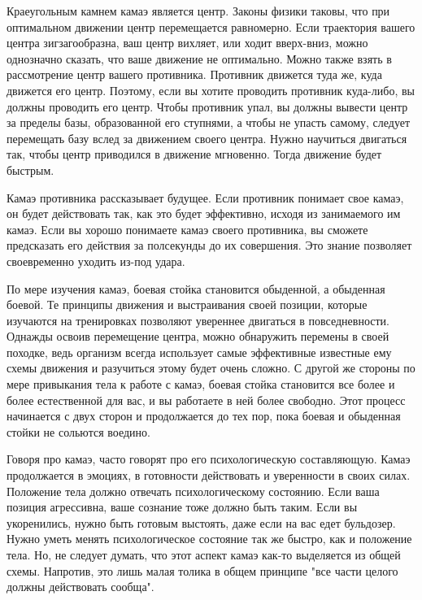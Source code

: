 \documentclass[russian,]{article}
\begin{document}
Краеугольным камнем камаэ является центр. Законы физики таковы, что при оптимальном движении центр перемещается равномерно. Если траектория вашего центра зигзагообразна, ваш центр вихляет, или ходит вверх-вниз, можно однозначно сказать, что ваше движение не оптимально. Можно также взять в рассмотрение центр вашего противника. Противник движется туда же, куда движется его центр. Поэтому, если вы хотите проводить противник куда-либо, вы должны проводить его центр. Чтобы противник упал, вы должны вывести центр за пределы базы, образованной его ступнями, а чтобы не упасть самому, следует перемещать базу вслед за движением своего центра. Нужно научиться двигаться так, чтобы центр приводился в движение мгновенно. Тогда движение будет быстрым.

Камаэ противника рассказывает будущее. Если противник понимает свое камаэ, он будет действовать так, как это будет эффективно, исходя из занимаемого им камаэ. Если вы хорошо понимаете камаэ своего противника, вы сможете предсказать его действия за полсекунды до их совершения. Это знание позволяет своевременно уходить из-под удара.

По мере изучения камаэ, боевая стойка становится обыденной, а обыденная боевой. Те принципы движения и выстраивания своей позиции, которые изучаются на тренировках позволяют увереннее двигаться в повседневности. Однажды освоив перемещение центра, можно обнаружить перемены в своей походке, ведь организм всегда использует самые эффективные известные ему схемы движения и разучиться этому будет очень сложно. С другой же стороны по мере привыкания тела к работе с камаэ, боевая стойка становится все более и более естественной для вас, и вы работаете в ней более свободно. Этот процесс начинается с двух сторон и продолжается до тех пор, пока боевая и обыденная стойки не сольются воедино.

Говоря про камаэ, часто говорят про его психологическую составляющую. Камаэ продолжается в эмоциях, в готовности действовать и уверенности в своих силах. Положение тела должно отвечать психологическому состоянию. Если ваша позиция агрессивна, ваше сознание тоже должно быть таким. Если вы укоренились, нужно быть готовым выстоять, даже если на вас едет бульдозер. Нужно уметь менять психологическое состояние так же быстро, как и положение тела. Но, не следует думать, что этот аспект камаэ как-то выделяется из общей схемы. Напротив, это лишь малая толика в общем принципе "все части целого должны действовать сообща".
\end{document}
